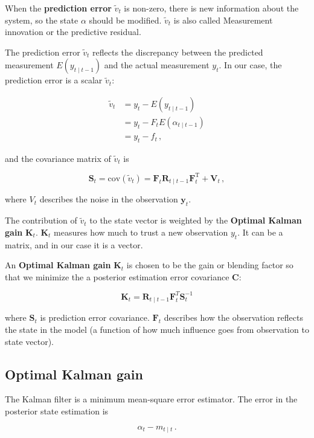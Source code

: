 When the \textbf{prediction error}  $\tilde{v}_t$  is non-zero, there is new information about the system, so the state  $\alpha$ should be modified. $\tilde{v}_t$ is also called Measurement innovation or the predictive residual.  

The prediction error $\tilde{v}_t$ reflects the discrepancy between the predicted measurement $E(y_{t\mid t-1})$ and the actual measurement $y_t$. In our case, the prediction error is a scalar $\tilde{v}_t$:

  
$$\begin{aligned}
\tilde v_t  &= y_t -E(y_{t\mid t-1} ) \\
& = y_t - F_{t} E(\alpha_{t\mid t-1} ) \\
& = y_t -f_{t}
\, ,
\end{aligned}$$

and the covariance matrix of $\tilde{v}_t$ is  

$$\mathbf{S}_{t} = \mathrm{cov}(\tilde{v}_t) 
 = \mathbf{F}_t \mathbf{R}_{t\mid t-1} \mathbf{F}_{t}^\text{T} + \mathbf{V}_t \, ,$$

where $V_t$ describes the noise in the observation $\mathbf{y}_t$.


The contribution of $\tilde{v}_t$ to the state vector is weighted by the \textbf{Optimal Kalman gain} $\mathbf{K}_t$. $\mathbf{K}_t$ measures how much to trust a new observation ${y}_t$. It can be a matrix, and in our case it is a vector.



An \textbf{Optimal Kalman gain} $\mathbf{K}_t$ is chosen to be the gain or blending factor so that we minimize the a posterior estimation error covariance  $\mathbf{C}$:


$$\mathbf{K}_t = \mathbf{R}_{t\mid t-1}\mathbf{F}_t^T \mathbf{S}_t^{-1}$$



where $\mathbf{S}_t$ is prediction error covariance.  $\mathbf{F}_t$ describes  how the observation reflects the state in the model (a function of how much influence goes from observation to state vector).


\subsection{Optimal Kalman gain} 


The Kalman filter is a minimum mean-square error estimator. The error in the  posterior state estimation is


$$\alpha_{t} - m_{t\mid t} \, .$$



